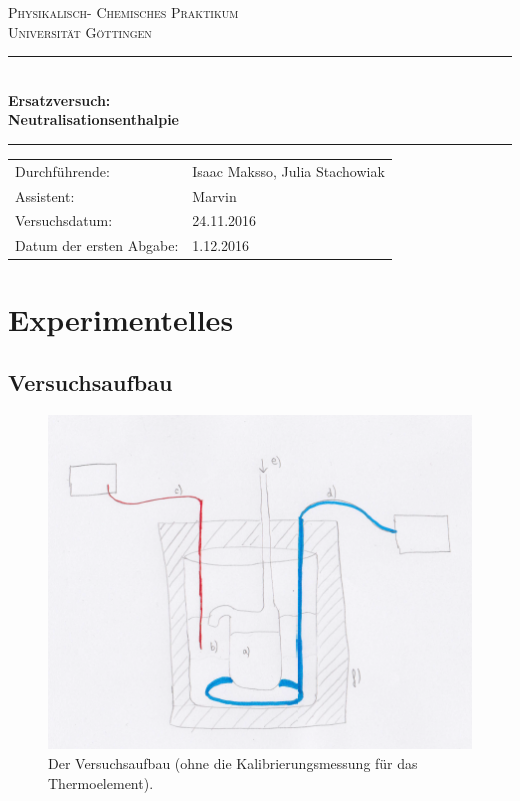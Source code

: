 \documentclass[12pt,a4paper,titlepage,headinclude,bibtotoc]{scrartcl}
\begin{document}
\begin{titlepage}
\centering
\textsc{\Large Physikalisch- Chemisches Praktikum\\[1.5ex] Universität Göttingen}

\vspace*{0.5cm}

\rule{\textwidth}{1pt}\\[0.5cm]
{\huge \bfseries
  Ersatzversuch: \\[1.5ex]
Neutralisationsenthalpie }\\[0.5cm]
\rule{\textwidth}{1pt}

\vspace*{0.5cm}


\begin{Large}
\begin{tabular}{ll}
Durchführende: &  Isaac Maksso, Julia Stachowiak\\
Assistent: & Marvin \\
 Versuchsdatum: & 24.11.2016\\
 Datum der ersten Abgabe: & 1.12.2016\\
\end{tabular}
\end{Large}

\vspace*{0.5cm}

\end{titlepage}


\tableofcontents

\section{Experimentelles}
\subsection{Versuchsaufbau}


\begin{figure}[h]
\centering
\includegraphics[scale=1]{Versuchsbau.png}
\caption{Der Versuchsaufbau (ohne die Kalibrierungsmessung für das Thermoelement).}
\end{figure} 
\FloatBarrier
\end{document}
